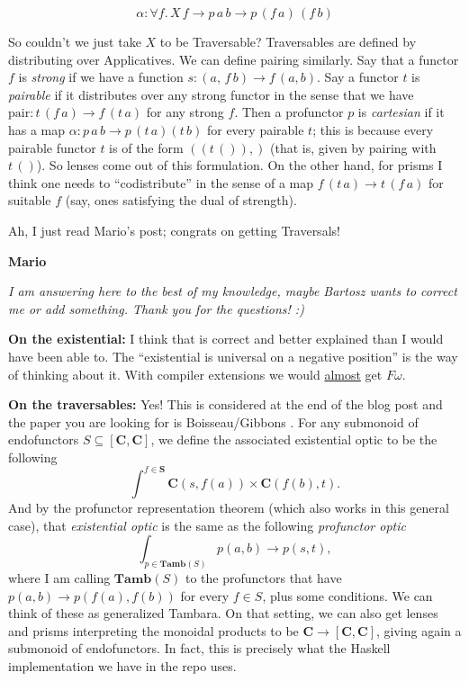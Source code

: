 \documentclass{amsart}
\newcommand{\respond}[1]{
  \vspace{1em} \textbf{#1}
}
\begin{document}
\begin{itemize}
    $$\alpha : \forall f.\, X\, f \to p\, a\, b \to p\, (f\, a)\, (f\, b)$$

    So couldn't we just take $X$ to be Traversable? Traversables are defined by
    distributing over Applicatives. We can define pairing similarly. Say that a
    functor $f$ is \emph{strong} if we have a function $s : (a,\, f\, b) \to f\, (a,
    b)$. Say a functor $t$ is \emph{pairable} if it distributes over any strong
    functor in the sense that we have $\text{pair} : t\, (f\, a) \to f\, (t\,
    a)$ for any strong $f$. Then a profunctor $p$ is \emph{cartesian} if it has a map $\alpha : p\,
    a\, b \to p\, (t\, a) (t\, b)$ for every pairable $t$; this is because every pairable functor $t$
    is of the form $((t\, ()),)$ (that is, given by pairing with $t\, ()$). So
    lenses come out of this formulation. On the other hand, for prisms I think
    one needs to ``codistribute'' in the sense of a map $f\, (t\, a) \to t\,
    (f\, a)$ for suitable $f$ (say, ones satisfying the dual of strength).  
\end{itemize}

Ah, I just read Mario's post; congrats on getting Traversals!

\respond{Mario}

\textit{I am answering here to the best of my
  knowledge, maybe Bartosz wants to correct me or add something.
  Thank you for the questions! :)}

\textbf{On the existential:} I think that is correct and better explained than
I would have been able to. The ``existential is universal on a negative position''
is the way of thinking about it. With compiler extensions we
would \href{https://stackoverflow.com/questions/21219773/are-ghcs-type-famlies-an-example-of-system-f-omega/21220357#21220357}{almost} get $F\omega$.


\textbf{On the traversables:} Yes! This is considered at the end of the blog post and the paper you are
looking for is Boisseau/Gibbons \cite{yonedaKnow}.
For any submonoid of endofunctors $S \subseteq [ \mathbf{C} , \mathbf{C} ]$,
we define the associated existential optic to be the following
\[
  \int^{f \in \mathbf{S}} \mathbf{C}(s,f(a)) \times \mathbf{C}(f(b) , t).
\]
And by the profunctor representation theorem (which also works in this general case),
that \textit{existential optic} is the same as
the following \textit{profunctor optic}
\[
  \int_{p \in \mathbf{Tamb}(S)} p(a,b) \to p(s,t),
\]
where I am calling $\mathbf{Tamb}(S)$ to the profunctors that have
$p(a,b) \to p(f(a), f(b))$ for every $f \in S$, plus some conditions.
We can think of these as generalized Tambara. On that setting, we can
also get lenses and prisms interpreting the monoidal products
to be $\mathbf{C} \to [ \mathbf{C} , \mathbf{C} ]$, giving again a
submonoid of endofunctors.  In fact, this is precisely what the Haskell implementation
we have in the repo uses.
\end{document}
